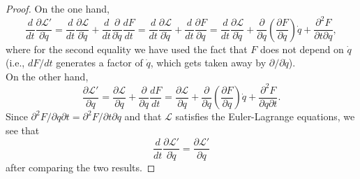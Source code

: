 \documentclass{article}
\theoremstyle{definition}
\newcommand{\p}{\partial}
\newcommand{\lag}{\mathcal{L}}
\newcommand{\f}[2]{\frac{#1}{#2}}
\newcommand{\lp}{\left(}
\newcommand{\rp}{\right)}
\begin{document}
\begin{proof}
	On the one hand, 
	\begin{equation*}
	\f{d}{dt} \f{\p \lag'}{\p \dot{q}}  =
	\f{d}{dt} \f{\p \lag}{\p \dot{q}}  + \f{d}{dt} \f{\p }{\p \dot{q}} \f{d F}{d t} =  \f{d}{dt} \f{\p \lag}{\p \dot{q}}  
	+ \f{d}{dt}\f{\p F}{\p q} 
	= \f{d}{dt} \f{\p \lag}{\p \dot{q}} 
	+ \f{\p}{\p q}\lp \f{\p F}{\p q} \rp \dot{q}
	+ \f{\p^2 F}{\p t \p q},
	\end{equation*}
	where for the second equality we have used the fact that $F$ does not depend on $\dot{q}$ (i.e., $d F/d t$ generates a factor of $\dot{q}$, which gets taken away by $\p/\p \dot{q}$). \\
	
	On the other hand,
	\begin{equation*}
	\f{\p \lag'}{\p q}  = \f{\p \lag }{\p q} +  \f{\p}{\p q} \f{dF}{dt} = \f{\p \lag }{\p q} +  \f{\p}{\p q} \lp \f{\p F}{\p q}\rp\dot{q} + \f{\p^2 F}{\p q\p t}.
	\end{equation*}
	Since $\p^2 F/\p q\p t = \p^2 F/\p t \p q$ and that $\lag$ satisfies the Euler-Lagrange equations, we see that 
	\begin{equation*}
	\f{d}{dt}\f{\p \lag'}{\p \dot{q}} = \f{\p \lag'}{\p q}
	\end{equation*}
	after comparing the two results.
\end{proof} 

	
	
	
	
	
	
	
	
	
	
	
	
	
	
	
\end{document}
